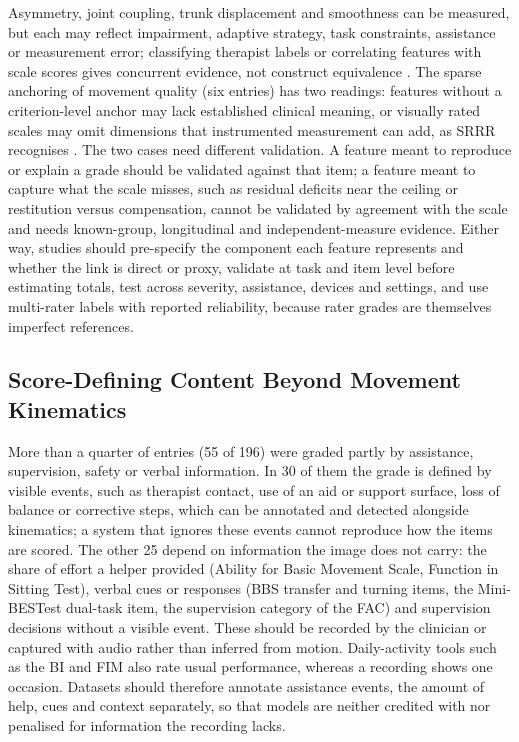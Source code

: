 \documentclass[11pt]{article}
\begin{document}
Asymmetry, joint coupling, trunk displacement and smoothness can be measured, but each may reflect impairment, adaptive strategy, task constraints, assistance or measurement error; classifying therapist labels or correlating features with scale scores gives concurrent evidence, not construct equivalence \cite{Zhi2018CompensationDetection,Lee2021SmartphoneVideoAmbulation,Li2017IMUEMGMotorEvaluation,Grimm2021KinematicValidation}. The sparse anchoring of movement quality (six entries) has two readings: features without a criterion-level anchor may lack established clinical meaning, or visually rated scales may omit dimensions that instrumented measurement can add, as SRRR recognises \cite{CoreKwakkel2019SRRRUpperLimb}. The two cases need different validation. A feature meant to reproduce or explain a grade should be validated against that item; a feature meant to capture what the scale misses, such as residual deficits near the ceiling or restitution versus compensation, cannot be validated by agreement with the scale and needs known-group, longitudinal and independent-measure evidence. Either way, studies should pre-specify the component each feature represents and whether the link is direct or proxy, validate at task and item level before estimating totals, test across severity, assistance, devices and settings, and use multi-rater labels with reported reliability, because rater grades are themselves imperfect references.

\subsection{Score-Defining Content Beyond Movement Kinematics}

More than a quarter of entries (55 of 196) were graded partly by assistance, supervision, safety or verbal information. In 30 of them the grade is defined by visible events, such as therapist contact, use of an aid or support surface, loss of balance or corrective steps, which can be annotated and detected alongside kinematics; a system that ignores these events cannot reproduce how the items are scored. The other 25 depend on information the image does not carry: the share of effort a helper provided (Ability for Basic Movement Scale, Function in Sitting Test), verbal cues or responses (BBS transfer and turning items, the Mini-BESTest dual-task item, the supervision category of the FAC) and supervision decisions without a visible event. These should be recorded by the clinician or captured with audio rather than inferred from motion. Daily-activity tools such as the BI and FIM also rate usual performance, whereas a recording shows one occasion. Datasets should therefore annotate assistance events, the amount of help, cues and context separately, so that models are neither credited with nor penalised for information the recording lacks.
\end{document}
